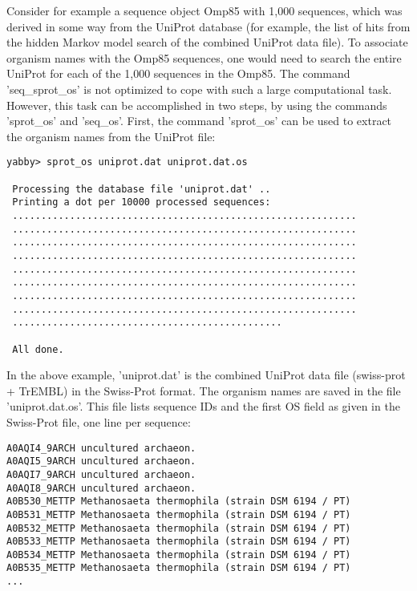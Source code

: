 
Consider for example a sequence object Omp85 with 1,000
sequences, which was derived in some way from the UniProt
database (for example, the list of hits from the hidden
Markov model search of the combined UniProt data file).
To associate organism names with the Omp85 sequences, one
would need to search the entire UniProt for each of the
1,000 sequences in the Omp85.  The command 'seq\_sprot\_os'
is not optimized to cope with such a large computational 
task. However, this task can be accomplished in two steps,
by using the commands 'sprot\_os' and 'seq\_os'. First,
the command 'sprot\_os' can be used to extract the organism
names from the UniProt file:

\begin{verbatim}
yabby> sprot_os uniprot.dat uniprot.dat.os

 Processing the database file 'uniprot.dat' ..
 Printing a dot per 10000 processed sequences:
 ............................................................
 ............................................................
 ............................................................
 ............................................................
 ............................................................
 ............................................................
 ............................................................
 ............................................................
 ...............................................

 All done.
\end{verbatim}

In the above example, 'uniprot.dat' is the combined UniProt
data file (swiss-prot + TrEMBL) in the Swiss-Prot format.
The organism names are saved in the file 'uniprot.dat.os'.
This file lists sequence IDs and the first OS field as given
in the Swiss-Prot file, one line per sequence:

\begin{verbatim}
A0AQI4_9ARCH uncultured archaeon.
A0AQI5_9ARCH uncultured archaeon.
A0AQI7_9ARCH uncultured archaeon.
A0AQI8_9ARCH uncultured archaeon.
A0B530_METTP Methanosaeta thermophila (strain DSM 6194 / PT)
A0B531_METTP Methanosaeta thermophila (strain DSM 6194 / PT)
A0B532_METTP Methanosaeta thermophila (strain DSM 6194 / PT)
A0B533_METTP Methanosaeta thermophila (strain DSM 6194 / PT)
A0B534_METTP Methanosaeta thermophila (strain DSM 6194 / PT)
A0B535_METTP Methanosaeta thermophila (strain DSM 6194 / PT)
...
\end{verbatim}

